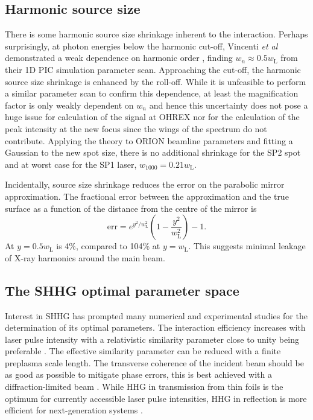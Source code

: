 \subsection{Harmonic source size}
There is some harmonic source size shrinkage inherent to the interaction. Perhaps surprisingly, at photon energies below the harmonic cut-off, Vincenti \textit{et al} demonstrated a weak dependence on harmonic order \cite{vincentiOpticalPropertiesRelativistic2014}, finding $w_n \approx 0.5 w_\mathrm{L}$ from their 1D PIC simulation parameter scan. Approaching the cut-off, the harmonic source size shrinkage is enhanced by the roll-off. While it is unfeasible to perform a similar parameter scan to confirm this dependence, at least the magnification factor is only weakly dependent on $w_n$ and hence this uncertainty does not pose a huge issue for calculation of the signal at OHREX nor for the calculation of the peak intensity at the new focus since the wings of the spectrum do not contribute. Applying the theory to ORION beamline parameters and fitting a Gaussian to the new spot size, there is no additional shrinkage for the SP2 spot and at worst case for the SP1 laser, $w_{1000} = 0.21w_\mathrm{L}$.

Incidentally, source size shrinkage reduces the error on the parabolic mirror approximation. The fractional error between the approximation and the true surface as a function of the distance from the centre of the mirror is
\begin{equation}
	\mathrm{err} = e^{y^2/w^2_\mathrm{L}}\left(1-\frac{y^2}{w^2_\mathrm{L}}\right)-1.
\end{equation}
At $y=0.5 w_\mathrm{L}$ is 4\%, compared to 104\% at $y= w_\mathrm{L}$. This suggests minimal leakage of X-ray harmonics around the main beam.

\subsection{The SHHG optimal parameter space}
Interest in SHHG has prompted many numerical and experimental studies for the determination of its optimal parameters. The interaction efficiency increases with laser pulse intensity \cite{pukhovRelativisticHighHarmonics2009, edwardsXRayEmissionEffectiveness2020} with a relativistic similarity parameter close to unity being preferable \cite{edwardsXRayEmissionEffectiveness2020, gonoskovUltrarelativisticNanoplasmonicsRoute2011}. The effective similarity parameter can be reduced with a finite preplasma scale length. The transverse coherence of the incident beam should be as good as possible to mitigate phase errors, this is best achieved with a diffraction-limited beam \cite{dromeyHighHarmonicGeneration2006}. While HHG in transmission from thin foils is the optimum for currently accessible laser pulse intensities, HHG in reflection is more efficient for next-generation systems \cite{edwardsElectronNanobunchWidthDominatedSpectralPower2020}. 

